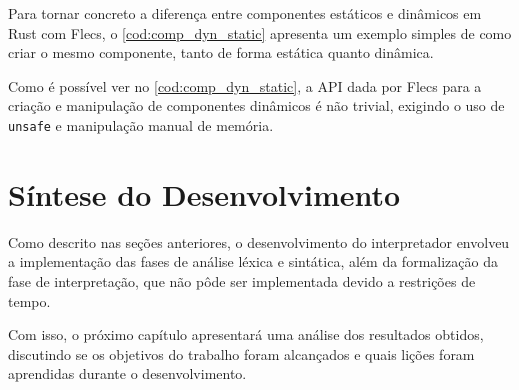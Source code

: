 Para tornar concreto a diferença entre componentes estáticos e dinâmicos em Rust com Flecs, o \autoref{cod:comp_dyn_static} apresenta um exemplo simples de como criar o mesmo componente, tanto de forma estática quanto dinâmica.

\codigoRust

\vspace{-1em}

Como é possível ver no \autoref{cod:comp_dyn_static}, a API dada por Flecs para a criação e manipulação de componentes dinâmicos é não trivial, exigindo o uso de \texttt{unsafe} e manipulação manual de memória.

\section{Síntese do Desenvolvimento}

Como descrito nas seções anteriores, o desenvolvimento do interpretador envolveu a implementação das fases de análise léxica e sintática, além da formalização da fase de interpretação, que não pôde ser implementada devido a restrições de tempo.

Com isso, o próximo capítulo apresentará uma análise dos resultados obtidos, discutindo se os objetivos do trabalho foram alcançados e quais lições foram aprendidas durante o desenvolvimento.
